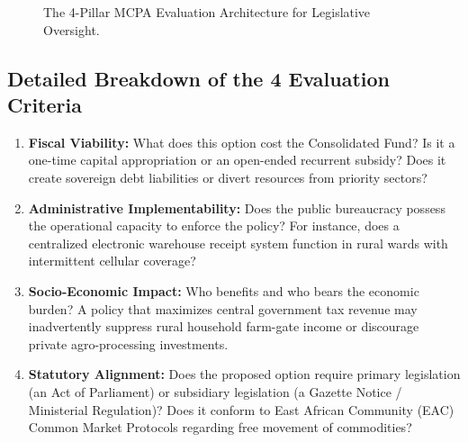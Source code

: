\documentclass[11pt, a4paper]{report}
\begin{document}
\begin{figure}[htbp]
  \centering
  \caption{The 4-Pillar MCPA Evaluation Architecture for Legislative Oversight.}
  \label{fig:mcpa_pillars}
\end{figure}

\subsection{Detailed Breakdown of the 4 Evaluation Criteria}
\begin{enumerate}[label=\textbf{\arabic*.}]
    \item \textbf{Fiscal Viability:} What does this option cost the Consolidated Fund? Is it a one-time capital appropriation or an open-ended recurrent subsidy? Does it create sovereign debt liabilities or divert resources from priority sectors?
    \item \textbf{Administrative Implementability:} Does the public bureaucracy possess the operational capacity to enforce the policy? For instance, does a centralized electronic warehouse receipt system function in rural wards with intermittent cellular coverage?
    \item \textbf{Socio-Economic Impact:} Who benefits and who bears the economic burden? A policy that maximizes central government tax revenue may inadvertently suppress rural household farm-gate income or discourage private agro-processing investments.
    \item \textbf{Statutory Alignment:} Does the proposed option require primary legislation (an Act of Parliament) or subsidiary legislation (a Gazette Notice / Ministerial Regulation)? Does it conform to East African Community (EAC) Common Market Protocols regarding free movement of commodities?
\end{enumerate}
\end{document}
